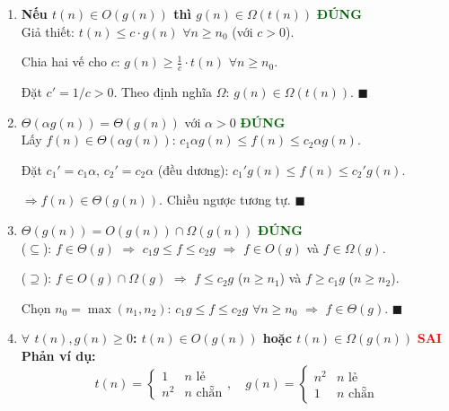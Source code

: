 \documentclass[12pt,a4paper]{article}
\begin{document}
\begin{enumerate}[label=\textbf{\alph*.}]

  \item \textbf{Nếu $t(n) \in O(g(n))$ thì $g(n) \in \Omega(t(n))$} \hfill \textcolor{darkgreen}{\textbf{ĐÚNG}} \\[4pt]

  Giả thiết: $t(n) \leq c \cdot g(n)$ $\forall n \geq n_0$ (với $c > 0$).

  Chia hai vế cho $c$: $g(n) \geq \frac{1}{c} \cdot t(n)$ $\forall n \geq n_0$.

  Đặt $c' = 1/c > 0$. Theo định nghĩa $\Omega$: $g(n) \in \Omega(t(n))$. \hfill $\blacksquare$

  \bigskip

  \item $\Theta(\alpha g(n)) = \Theta(g(n))$ với $\alpha > 0$ \hfill \textcolor{darkgreen}{\textbf{ĐÚNG}} \\[4pt]

  Lấy $f(n) \in \Theta(\alpha g(n))$: $c_1 \alpha g(n) \leq f(n) \leq c_2 \alpha g(n)$.

  Đặt $c_1' = c_1\alpha$, $c_2' = c_2\alpha$ (đều dương): $c_1' g(n) \leq f(n) \leq c_2' g(n)$.

  $\Longrightarrow f(n) \in \Theta(g(n))$. Chiều ngược tương tự. \hfill $\blacksquare$

  \bigskip

  \item $\Theta(g(n)) = O(g(n)) \cap \Omega(g(n))$ \hfill \textcolor{darkgreen}{\textbf{ĐÚNG}} \\[4pt]

  ($\subseteq$): $f \in \Theta(g)$ $\Rightarrow$ $c_1 g \leq f \leq c_2 g$ $\Rightarrow$ $f \in O(g)$ và $f \in \Omega(g)$.

  ($\supseteq$): $f \in O(g) \cap \Omega(g)$ $\Rightarrow$ $f \leq c_2 g$ ($n \geq n_1$) và $f \geq c_1 g$ ($n \geq n_2$).

  Chọn $n_0 = \max(n_1, n_2)$: $c_1 g \leq f \leq c_2 g$ $\forall n \geq n_0$ $\Rightarrow$ $f \in \Theta(g)$. \hfill $\blacksquare$

  \bigskip

  \item \textbf{$\forall$ $t(n), g(n) \geq 0$: $t(n) \in O(g(n))$ hoặc $t(n) \in \Omega(g(n))$} \hfill \textcolor{red}{\textbf{SAI}} \\[4pt]

  \textbf{Phản ví dụ:}
  \[
    t(n) = \begin{cases} 1 & n \text{ lẻ} \\ n^2 & n \text{ chẵn} \end{cases}, \quad
    g(n) = \begin{cases} n^2 & n \text{ lẻ} \\ 1 & n \text{ chẵn} \end{cases}
  \]


\end{enumerate}
\end{document}
